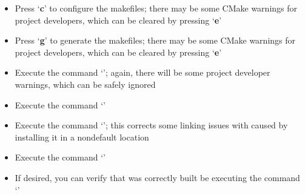 \begin{itemize}
recommended that the option\\
`\textbf{ENABLE\fUS{}YARPRUN\fUS{}LOG}' should be enabled and the options
`\textbf{CREATE\fUS{}YMANAGER}' and\\
`\textbf{YARP\fUS{}USE\fUS{}READLINE}' should be disabled
\item\exSp{}Press `\textbf{c}' to configure the makefiles; there may be some CMake
warnings for project developers, which can be cleared by pressing `\textbf{e}'
\item\exSp{}Press `\textbf{g}' to generate the makefiles; there may be some CMake
warnings for project developers, which can be cleared by pressing `\textbf{e}'
\item\exSp{}Execute the command `'; again, there will be some project
developer warnings, which can be safely ignored
\item\exSp{}Execute the command `'
\item\exSp{}Execute the command `'; this corrects some
linking issues with \yarp{} caused by installing it in a non\longDash{}default location
\item\exSp{}Execute the command `'
\item\exSp{}If desired, you can verify that \yarp{} was correctly built be executing the
command `'
\end{itemize}
\tertiaryEnd
{}
